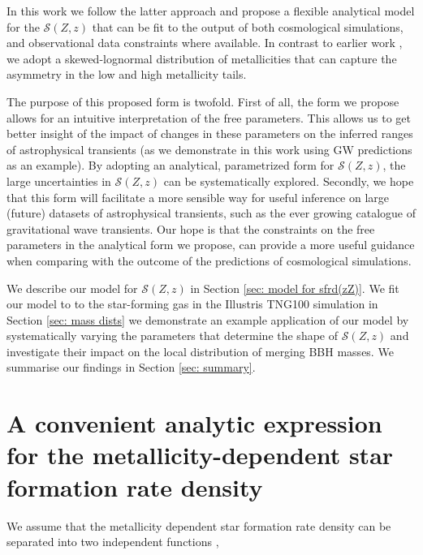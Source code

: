 \documentclass[twocolumn]{aastex631}
\newcommand{\SFRDzZ}{\ensuremath{\mathcal{S}(Z,z)}\xspace}
\begin{document}
In this work we follow the latter approach and propose a flexible analytical model for the \SFRDzZ that can be fit to the output of both cosmological simulations, and observational data constraints where available. 
In contrast to earlier work  \citep{LangerNorman, Neijssel+2019}, we adopt a skewed-lognormal distribution of metallicities that can capture the asymmetry in the low and high metallicity tails. %

The purpose of this proposed form is twofold.  
First of all, the form we propose allows for an intuitive interpretation of the free parameters. This allows us to get better insight of the impact of changes in these parameters on the inferred ranges of astrophysical transients (as we demonstrate in this work using GW predictions as an example). By adopting an analytical, parametrized form for \SFRDzZ, the large uncertainties in \SFRDzZ can be systematically explored.
Secondly, we hope that this form will facilitate a more sensible way for useful inference on large (future) datasets of astrophysical transients, such as the ever growing catalogue of gravitational wave transients. Our hope is that the constraints on the free parameters in the analytical form we propose, can provide a more useful guidance when comparing with the outcome of the predictions of cosmological simulations. 


We describe our model for \SFRDzZ in Section \ref{sec: model for sfrd(zZ)}.
We fit our model to to the star-forming gas in the Illustris TNG100 simulation in Section \ref{sec: mass dists} we demonstrate an example application of our model by systematically varying the parameters that determine the shape of \SFRDzZ and investigate their impact on the local distribution of merging BBH masses.
We summarise our findings in Section \ref{sec: summary}.


\section{A convenient analytic expression for the metallicity-dependent star formation rate density \label{sec: model for sfrd(zZ)} }
We assume that the metallicity dependent star formation rate density can be separated into two independent functions \citep[e.g.\ ][]{Langer2006},
\end{document}
